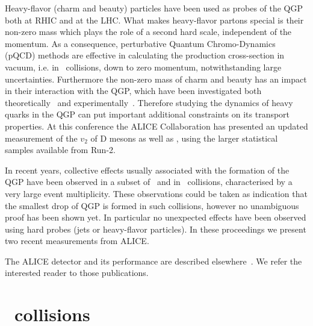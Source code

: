 \documentclass[10pt]{article}
\begin{document}
Heavy-flavor (charm and beauty) particles have been used as probes of the QGP both at RHIC and at the LHC. What makes heavy-flavor partons special is their non-zero mass which plays the role of a second hard scale, independent of the momentum.
As a consequence, perturbative Quantum Chromo-Dynamics (pQCD) methods are effective in calculating the production cross-section in vacuum, i.e. in \pp\ collisions, down to zero momentum, notwithstanding large uncertainties.
Furthermore the non-zero mass of charm and beauty has an impact in their interaction with the QGP, which have been investigated both theoretically~\cite{} and experimentally~\cite{}. 
Therefore studying the dynamics of heavy quarks in the QGP can put important additional constraints on its transport properties.
At this conference the ALICE Collaboration has presented an updated measurement of the $v_2$ of D mesons as well as \jpsi, using the larger statistical samples available from Run-2.

In recent years, collective effects usually associated with the formation of the QGP have been observed in a subset of \pPb\ and in \pp\ collisions, characterised by a very large event multiplicity. These observations could be taken as indication that the smallest drop
of QGP is formed in such collisions, however no unambiguous proof has been shown yet. In particular no unexpected effects have been observed using hard probes (jets or heavy-flavor particles). In these proceedings we present two recent measurements from ALICE.

The ALICE detector and its performance are described elsewhere~\cite{}. We refer the interested reader to those publications.

\section{\PbPb\ collisions}
\end{document}
